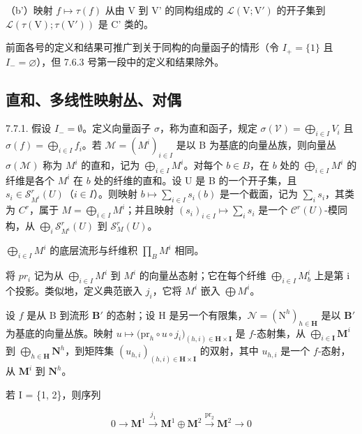 （b'）映射 \(f\mapsto\tau(f)\) 从由 V 到 V' 的同构组成的 \(\mathcal{L}(\mathrm{V};\mathrm{V}')\) 的开子集到 \(\mathcal{L}(\tau(\mathrm{V});\tau(\mathrm{V}'))\) 是 C' 类的。

前面各号的定义和结果可推广到关于同构的向量函子的情形（令 \(I_{+} = \{1\}\) 且 \(I_{-} = \varnothing\)），但 7.6.3 号第一段中的定义和结果除外。

\subsection{直和、多线性映射丛、对偶}

7.7.1. 假设 \(I_{-} = \emptyset\)。定义向量函子 \(\sigma\)，称为直和函子，规定 \(\sigma(\mathcal{V}) = \bigoplus_{i \in I} V_i\) 且 \(\sigma(f) = \bigoplus_{i \in I} f_i\)。若 \(\mathcal{M} = (M^i)_{i \in I}\) 是以 B 为基底的向量丛族，则向量丛 \(\sigma(\mathcal{M})\) 称为 \(M^i\) 的直和，记为 \(\bigoplus_{i \in I} M^i\)。对每个 \(b \in B\)，在 \(b\) 处的 \(\bigoplus_{i \in I} M^i\) 的纤维是各个 \(M^i\) 在 \(b\) 处的纤维的直和。设 U 是 B 的一个开子集，且 \(s_i \in \mathscr{S}_{M^i}^r(U)\)（\(i \in I\)）。则映射 \(b \mapsto \sum_{i \in I} s_i(b)\) 是一个截面，记为 \(\sum_{i} s_i\)，其类为 \(C^r\)，属于 \(M = \bigoplus_{i \in I} M^i\)；并且映射 \((s_i)_{i \in I} \mapsto \sum_{i} s_i\) 是一个 \(\mathscr{C}^r(U)\)-模同构，从 \(\bigoplus_{i} \mathscr{S}_{M^i}^r(U)\) 到 \(\mathscr{S}_M^r(U)\)。

\(\bigoplus_{i\in I}M^{i}\) 的底层流形与纤维积 \(\prod_{B}M^{i}\) 相同。

将 \(pr_{i}\) 记为从 \(\bigoplus_{i\in I} M^{i}\) 到 \(M^{i}\) 的向量丛态射；它在每个纤维 \(\bigoplus_{i\in I} M_{b}^{i}\) 上是第 i 个投影。类似地，定义典范嵌入 \(j_{i}\)，它将 \(M^{i}\) 嵌入 \(\bigoplus M^{i}\)。

设 \(f\) 是从 B 到流形 \(\mathbf{B}'\) 的态射；设 H 是另一个有限集，\(\mathcal{N} = (\mathrm{N}^{h})_{h\in \mathbf{H}}\) 是以 \(\mathbf{B}'\) 为基底的向量丛族。映射 \(u\mapsto \bigl(\mathrm{pr}_{h}\circ u\circ j_{i}\bigr)_{(h,i)\in \mathbf{H}\times \mathbf{I}}\) 是 \(f\)-态射集，从 \(\bigoplus_{i\in \mathbf{I}}\mathbf{M}^i\) 到 \(\bigoplus_{h\in \mathbf{H}}\mathbf{N}^h\)，到矩阵集 \((u_{h,i})_{(h,i)\in \mathbf{H}\times \mathbf{I}}\) 的双射，其中 \(u_{h,i}\) 是一个 \(f\)-态射，从 \(\mathbf{M}^i\) 到 \(\mathbf{N}^h\)。

若 I = \{1, 2\}，则序列

\[
0 \to \mathbf {M}^{1} \xrightarrow{j_{1}} \mathbf {M}^{1} \oplus \mathbf {M}^{2} \stackrel{\mathrm{pr}_{2}}{\to} \mathbf {M}^{2} \to 0
\]

